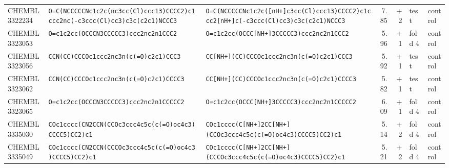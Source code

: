\begin{longtable}{l p{4.4cm} p{4.4cm} r r l l}
CHEMBL3322234 & \texttt{O=\allowbreak{}C(\allowbreak{}NCCCCCNc1c2c(\allowbreak{}nc3cc(\allowbreak{}Cl)\allowbreak{}ccc13)\allowbreak{}CCCC2)\allowbreak{}c1ccc2nc(\allowbreak{}-c3ccc(\allowbreak{}Cl)\allowbreak{}cc3)\allowbreak{}c3c(\allowbreak{}c2c1)\allowbreak{}NCCC3} & \texttt{O=\allowbreak{}C(\allowbreak{}NCCCCCNc1c2c(\allowbreak{}[nH+]\allowbreak{}c3cc(\allowbreak{}Cl)\allowbreak{}ccc13)\allowbreak{}CCCC2)\allowbreak{}c1ccc2[nH+]\allowbreak{}c(\allowbreak{}-c3ccc(\allowbreak{}Cl)\allowbreak{}cc3)\allowbreak{}c3c(\allowbreak{}c2c1)\allowbreak{}NCCC3} & 7.85 & +2 & test & control \\
CHEMBL3323053 & \texttt{O=\allowbreak{}c1c2cc(\allowbreak{}OCCCN3CCCCC3)\allowbreak{}ccc2nc2n1CCC2} & \texttt{O=\allowbreak{}c1c2cc(\allowbreak{}OCCC[NH+]\allowbreak{}3CCCCC3)\allowbreak{}ccc2nc2n1CCC2} & 5.96 & +1 & fold 4 & control \\
CHEMBL3323056 & \texttt{CCN(\allowbreak{}CC)\allowbreak{}CCCOc1ccc2nc3n(\allowbreak{}c(\allowbreak{}=\allowbreak{}O)\allowbreak{}c2c1)\allowbreak{}CCC3} & \texttt{CC[NH+]\allowbreak{}(\allowbreak{}CC)\allowbreak{}CCCOc1ccc2nc3n(\allowbreak{}c(\allowbreak{}=\allowbreak{}O)\allowbreak{}c2c1)\allowbreak{}CCC3} & 5.92 & +1 & test & control \\
CHEMBL3323062 & \texttt{CCN(\allowbreak{}CC)\allowbreak{}CCCOc1ccc2nc3n(\allowbreak{}c(\allowbreak{}=\allowbreak{}O)\allowbreak{}c2c1)\allowbreak{}CCCC3} & \texttt{CC[NH+]\allowbreak{}(\allowbreak{}CC)\allowbreak{}CCCOc1ccc2nc3n(\allowbreak{}c(\allowbreak{}=\allowbreak{}O)\allowbreak{}c2c1)\allowbreak{}CCCC3} & 5.82 & +1 & test & control \\
CHEMBL3323065 & \texttt{O=\allowbreak{}c1c2cc(\allowbreak{}OCCCN3CCCCC3)\allowbreak{}ccc2nc2n1CCCCC2} & \texttt{O=\allowbreak{}c1c2cc(\allowbreak{}OCCC[NH+]\allowbreak{}3CCCCC3)\allowbreak{}ccc2nc2n1CCCCC2} & 6.09 & +1 & fold 4 & control \\
CHEMBL3335030 & \texttt{COc1cccc(\allowbreak{}CN2CCN(\allowbreak{}CCOc3ccc4c5c(\allowbreak{}c(\allowbreak{}=\allowbreak{}O)\allowbreak{}oc4c3)\allowbreak{}CCCC5)\allowbreak{}CC2)\allowbreak{}c1} & \texttt{COc1cccc(\allowbreak{}C[NH+]\allowbreak{}2CC[NH+]\allowbreak{}(\allowbreak{}CCOc3ccc4c5c(\allowbreak{}c(\allowbreak{}=\allowbreak{}O)\allowbreak{}oc4c3)\allowbreak{}CCCC5)\allowbreak{}CC2)\allowbreak{}c1} & 5.14 & +2 & fold 4 & control \\
CHEMBL3335049 & \texttt{COc1cccc(\allowbreak{}CN2CCN(\allowbreak{}CCCOc3ccc4c5c(\allowbreak{}c(\allowbreak{}=\allowbreak{}O)\allowbreak{}oc4c3)\allowbreak{}CCCC5)\allowbreak{}CC2)\allowbreak{}c1} & \texttt{COc1cccc(\allowbreak{}C[NH+]\allowbreak{}2CC[NH+]\allowbreak{}(\allowbreak{}CCCOc3ccc4c5c(\allowbreak{}c(\allowbreak{}=\allowbreak{}O)\allowbreak{}oc4c3)\allowbreak{}CCCC5)\allowbreak{}CC2)\allowbreak{}c1} & 5.21 & +2 & fold 4 & control \\

\end{longtable}
